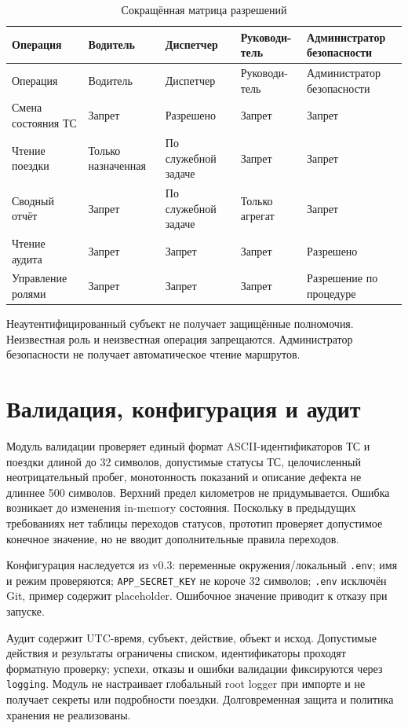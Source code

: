\documentclass[12pt,a4paper]{article}
\begin{document}
\begin{longtable}{p{3.2cm}p{2.2cm}p{2.2cm}p{2.2cm}p{3.6cm}}
\caption{Сокращённая матрица разрешений}\\
\toprule Операция & Водитель & Диспетчер & \shortstack{Руководи-\\тель} & \shortstack{Администратор\\безопасности}\\\midrule\endfirsthead
\toprule Операция & Водитель & Диспетчер & \shortstack{Руководи-\\тель} & \shortstack{Администратор\\безопасности}\\\midrule\endhead
Смена состояния ТС & Запрет & Разрешено & Запрет & Запрет\\
Чтение поездки & Только назначенная & По служебной задаче & Запрет & Запрет\\
Сводный отчёт & Запрет & По служебной задаче & Только агрегат & Запрет\\
Чтение аудита & Запрет & Запрет & Запрет & Разрешено\\
Управление ролями & Запрет & Запрет & Запрет & Разрешение по процедуре\\
\bottomrule
\end{longtable}
Неаутентифицированный субъект не получает защищённые полномочия. Неизвестная роль и неизвестная операция запрещаются. Администратор безопасности не получает автоматическое чтение маршрутов.

\section{Валидация, конфигурация и аудит}
Модуль валидации проверяет единый формат ASCII-идентификаторов ТС и поездки длиной до 32 символов, допустимые статусы ТС, целочисленный неотрицательный пробег, монотонность показаний и описание дефекта не длиннее 500 символов. Верхний предел километров не придумывается. Ошибка возникает до изменения in-memory состояния. Поскольку в предыдущих требованиях нет таблицы переходов статусов, прототип проверяет допустимое конечное значение, но не вводит дополнительные правила переходов.

Конфигурация наследуется из v0.3: переменные окружения/локальный \texttt{.env}; имя и режим проверяются; \texttt{APP\_SECRET\_KEY} не короче 32 символов; \texttt{.env} исключён Git, пример содержит placeholder. Ошибочное значение приводит к отказу при запуске.

Аудит содержит UTC-время, субъект, действие, объект и исход. Допустимые действия и результаты ограничены списком, идентификаторы проходят форматную проверку; успехи, отказы и ошибки валидации фиксируются через \texttt{logging}. Модуль не настраивает глобальный root logger при импорте и не получает секреты или подробности поездки. Долговременная защита и политика хранения не реализованы.
\end{document}
